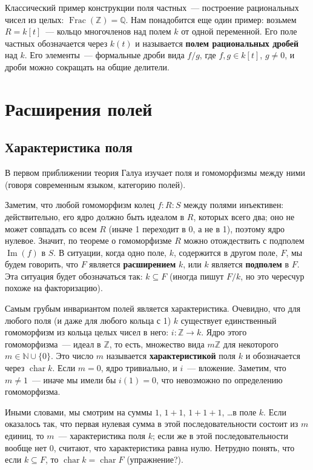 \documentclass[a4paper,11pt]{scrartcl}
\theoremstyle{plain}
\theoremstyle{definition}
\newcommand\dfn[1]{\textbf{#1}}
\newcommand\mb{\mathbb}
\newcommand\sseq{\subseteq}
\newcommand\Frac{\operatorname{Frac}}
\newcommand{\Img}{\operatorname{Im}}
\newcommand\cchar{\operatorname{char}}
\begin{document}
Классический пример конструкции поля частных~--- построение
рациональных чисел из целых: $\Frac(\mb Z)=\mb Q$. Нам понадобится еще
один пример: возьмем $R=k[t]$~--- кольцо многочленов над полем $k$ от
одной переменной. Его поле частных обозначается через $k(t)$ и
называется \dfn{полем рациональных дробей} над $k$. Его элементы~---
формальные дроби вида $f/g$, где $f,g\in k[t]$, $g\neq 0$, и дроби
можно сокращать на общие делители.

\section{Расширения полей}

\subsection{Характеристика поля}

В первом приближении теория Галуа изучает поля и гомоморфизмы между
ними (говоря современным языком, категорию полей).

Заметим, что любой гомоморфизм колец $f\colon R\colon S$ между
полями инъективен: действительно, его ядро должно быть идеалом в
$R$, которых всего два; оно не может совпадать со всем $R$
(иначе 1 переходит в 0, а не в 1), поэтому ядро нулевое. Значит, по
теореме о гомоморфизме $R$ можно отождествить с подполем $\Img(f)$ в
$S$.
В ситуации, когда одно поле, $k$, содержится в другом поле, $F$, мы
будем говорить, что $F$ является \dfn{расширением} $k$, или $k$
является \dfn{подполем} в $F$. Эта ситуация будет обозначаться так:
$k\sseq F$ (иногда пишут $F/k$, но это чересчур похоже на
факторизацию).

Самым грубым инвариантом полей является характеристика. Очевидно, что
для любого поля (и даже для любого кольца с 1) $k$ существует
единственный гомоморфизм из кольца целых чисел в него: $i\colon \mb
Z\to k$. Ядро этого гомоморфизма~--- идеал в $\mb Z$, то есть,
множество вида $m\mb Z$ для некоторого $m\in\mb N\cup \{0\}$. Это
число $m$ называется \dfn{характеристикой} поля $k$ и обозначается
через $\cchar k$. Если $m=0$, ядро тривиально, и $i$~---
вложение. Заметим, что $m\neq 1$~--- иначе мы имели бы $i(1)=0$, что
невозможно по определению гомоморфизма.

Иными словами, мы смотрим на суммы $1$, $1+1$, $1+1+1$, \dots в поле
$k$. Если оказалось так, что первая нулевая сумма в этой
последовательности состоит из $m$ единиц, то $m$~--- характеристика
поля $k$; если же в этой последовательности вообще нет 0, считают, что
характеристика равна нулю.
Нетрудно понять, что если $k\sseq F$, то $\cchar k=\cchar F$
(упражнение?).
\end{document}
